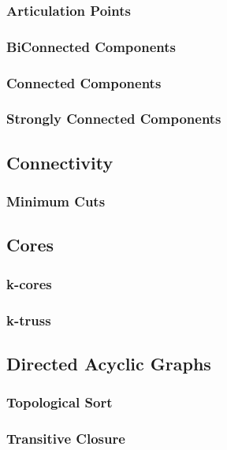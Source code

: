 \subsubsection{Articulation Points}
\subsubsection{BiConnected Components}
\subsubsection{Connected Components}
\subsubsection{Strongly Connected Components}

\subsection{Connectivity}
\subsubsection{Minimum Cuts}

\subsection{Cores}
\subsubsection{k-cores}
\subsubsection{k-truss}

\subsection{Directed Acyclic Graphs}
\subsubsection{Topological Sort}
\subsubsection{Transitive Closure}

